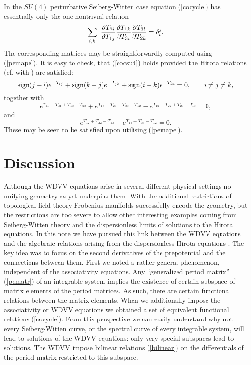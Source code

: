\documentclass[a4paper,]{article}
\def\d{\partial}
\def\sign{{\rm sign}}
\begin{document}
In the $SU(4)$ perturbative Seiberg-Witten case equation (\ref{cocycle})
has essentially only the one nontrivial relation 
\begin{equation}
\label{cocsu4}
\sum_{i,k}\
\dfrac{\d T_{2i}}{\d T_{1j}}\dfrac{\d T_{1k}}{\d T_{3i}}
\dfrac{\d T_{3l}}{\d T_{2k}}
= \delta\sp{j} _l.
\end{equation}
The corresponding matrices may be straightforwardly computed 
using (\ref{pemape}). It is easy to check, that (\ref{cocsu4}) holds
provided the Hirota relations (cf. with \cite{ZaHi}) are satisfied:
\begin{equation}
\label{h1}
\sign(j-i)e^{-T_{ij}} + \sign(k-j)e^{-T_{jk}} + \sign(i-k)e^{-T_{ki}} = 0,
\qquad
i \neq j \neq k,
\end{equation}
together with
\begin{equation}
\label{h2}
e^{T_{11}+T_{12}+T_{13}-T_{23}} + e^{T_{13}+T_{23}+T_{33}-T_{12}} -
e^{T_{12}+T_{22}+T_{23}-T_{13}} = 0,
\end{equation}
and
\begin{equation}
\label{h3}
e^{T_{12} + T_{22}-T_{13}} - e^{T_{13} + T_{33} - T_{12}} = 0.
\end{equation}
These may be seen to be satisfied upon utilising
(\ref{pemape}).

\section{Discussion}

Although the WDVV equations arise in several different physical settings
no unifying geometry as yet underpins them. With the additional restrictions
of topological field theory Frobenius manifolds successfully encode
the geometry, but the restrictions are too severe to allow other interesting
examples coming from Seiberg-Witten theory and the dispersionless limits of
solutions to the Hirota equations.
In this note we have pursued this link between the WDVV equations and 
the algebraic relations arising from the dispersionless Hirota 
equations \cite{BMRWZ}. The key idea was to focus on the second derivatives
of the prepotential and the connections between them.
First we noted a rather general phenomenon, independent of the 
associativity equations. Any ``generalized period matrix'' (\ref{pematr})
of an integrable system implies the existence of certain subspace
of matrix elements of the period matrices.
As such, there are certain functional relations between the matrix elements.
When we additionally impose the associativity or WDVV equations
we obtained a set of equivalent functional relations (\ref{cocycle}).
From this perspective we can easily understand why not every Seiberg-Witten
curve, or the spectral curve of every integrable system, will lead to
solutions of the WDVV equations: only very special subspaces lead to
solutions. The WDVV impose bilinear relations (\ref{bilinear}) 
on the differentials of the period matrix restricted to this subspace.
\end{document}
